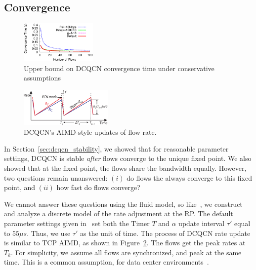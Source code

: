 \subsection{Convergence}
\label{sec:dcqcn_convergence}


\begin{figure}[t]
\centering
\includegraphics[width=0.33\textwidth]{figures/dcqcn_convergence_time.eps}
\vspace{-1em}
\caption{Upper bound on DCQCN convergence time under conservative assumptions}
\vspace{-1em}
\label{fig:dcqcn_convergence_time}
\end{figure}

\begin{figure}[t]
\center
\includegraphics[width=0.4\textwidth]{figures/dcqcn_convergence_brief.eps}
\caption{DCQCN's AIMD-style updates of flow rate.}
\vspace{-1em}
\label{fig:dcqcn_convergence}
\end{figure}

In Section~\ref{sec:dcqcn_stability}, we showed that for reasonable parameter
settings,  DCQCN is stable {\em after} flows converge to the unique fixed point.
We also showed that at the fixed point, the flows share the bandwidth equally.
However, two questions remain unanswered: $(i)$ do flows the always converge
to this fixed point, and $(ii)$ how fast do flows converge? 

We cannot answer these questions using the fluid model, so
like~\cite{dctcp-analysis}, we construct and analyze a discrete model of the
rate adjustment at the RP. The default parameter settings given in~\cite{dcqcn}
set both the Timer $T$ and $\alpha$ update interval $\tau '$ equal to $55\mu s$.
Thus, we use $\tau '$ as the unit of time.  The process of DCQCN rate update is
similar to TCP AIMD, as shown in Figure~\ref{fig:dcqcn_convergence}.  The flows
get the peak rates at $T_k$. For simplicity, we assume all flows are
synchronized, and peak at the same time.  This is a common assumption, for data
center environments~\cite{dctcp-analysis}.

